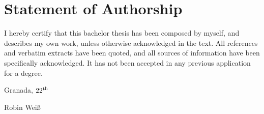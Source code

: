 \thispagestyle{empty}

\section*{Statement of Authorship}
I hereby certify that this bachelor thesis has been composed by myself, and describes my own work, unless otherwise acknowledged in the text. All references and verbatim extracts have been quoted, and all sources of information have been specifically acknowledged. It has not been accepted in any previous application for a degree.

\vspace{1cm}

\noindent 
Granada, $\the\day^{\text{th}}$ \monthname \: \the\year

\vspace{2cm}

\noindent
Robin Weiß
